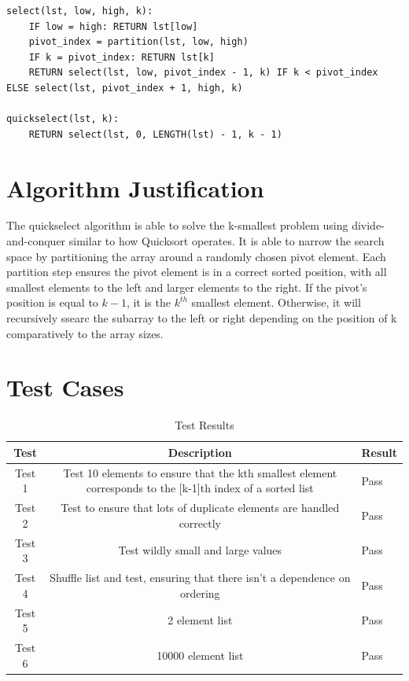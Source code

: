 \documentclass{labReport}
\begin{document}
\begin{multicols*}{2}
\begin{verbatim}
select(lst, low, high, k):
    IF low = high: RETURN lst[low]
    pivot_index = partition(lst, low, high)
    IF k = pivot_index: RETURN lst[k]
    RETURN select(lst, low, pivot_index - 1, k) IF k < pivot_index ELSE select(lst, pivot_index + 1, high, k)

quickselect(lst, k):
    RETURN select(lst, 0, LENGTH(lst) - 1, k - 1)
\end{verbatim}

\section{Algorithm Justification}
The quickselect algorithm is able to solve the k-smallest problem using divide-and-conquer similar to how Quicksort operates. It is able to narrow the search space by partitioning the array around a randomly chosen pivot element. Each partition step ensures the pivot element is in a correct sorted position, with all smallest elements to the left and larger elements to the right. If the pivot's position is equal to $k - 1$, it is the $k^{th}$ smallest element. Otherwise, it will recursively ssearc the subarray to the left or right depending on the position of k comparatively to the array sizes.


\section{Test Cases}
\begin{table}[h!]
    \centering
    \begin{tabular}{|c|c|}
    \hline
    Test & Description & Result \\
    \hline
    Test 1 & Test 10 elements to ensure that the kth smallest element corresponds to the [k-1]th index of a sorted list & Pass \\
    Test 2 & Test to ensure that lots of duplicate elements are handled correctly & Pass \\
    Test 3 & Test wildly small and large values & Pass \\
    Test 4 & Shuffle list and test, ensuring that there isn't a dependence on ordering & Pass \\
    Test 5 & 2 element list & Pass \\
    Test 6 & 10000 element list & Pass \\
    \hline
    \end{tabular}
    \caption{Test Results}
    \label{table:test_results}
\end{table}


\end{multicols*}
\end{document}
